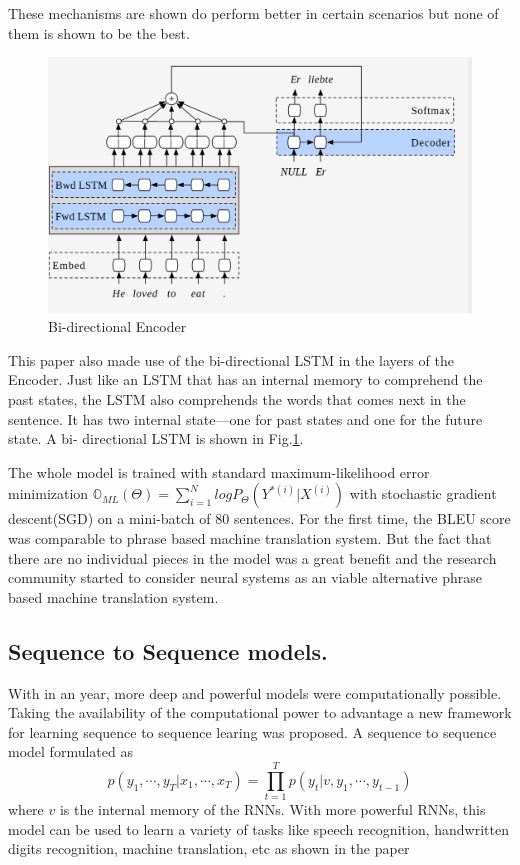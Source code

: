 \documentclass[a4paper]{article}
\begin{document}
These mechanisms  are shown  do perform better  in certain scenarios but none of
them is shown to be the best.


\begin{figure}
  \includegraphics[width=0.9\linewidth]{img/birnn.png}
  \caption{Bi-directional Encoder}
  \label{fig:birnn}
\end{figure}


This paper  also made  use of  the  bi-directional  LSTM  in  the layers  of the
Encoder. Just like  an  LSTM that has an internal memory to comprehend  the past
states, the LSTM also comprehends the words that comes next in the sentence.  It
has two internal state---one for past states and one for the future state. A bi-
directional LSTM is shown in Fig.\ref{fig:birnn}.

The whole model is trained with standard maximum-likelihood  error  minimization
$\mathbb{O}_{ML}(\Theta) = \sum_{i=1}^N log P_\Theta(Y^{*(i)} |  X^{(i)}) $ with
stochastic gradient  descent(SGD) on a mini-batch of 80 sentences. For the first
time, the BLEU score was comparable to phrase based machine  translation system.
But  the fact  that there  are  no  individual pieces  in the  model was a great
benefit and the  research  community started to  consider  neural systems as  an
viable alternative phrase based machine translation system.


\subsection{Sequence  to Sequence models.}
\label{sec:seq}  With  in  an  year,  more   deep   and   powerful  models  were
computationally possible. Taking the availability of the computational power  to
advantage  a  new  framework  for  learning  sequence  to sequence  learing was
proposed. A sequence to sequence model formulated as $$ p(y_1, \cdots, y_T| x_1,
\cdots, x_T) =  \prod_{t=1}^{T} p(y_t| v, y_1,  \cdots,  y_{t-1})$$ where $v$ is
the internal memory of the RNNs. With more powerful RNNs, this model can be used
to  learn a  variety  of  tasks  like  speech  recognition,  handwritten  digits
recognition,   machine   translation,    etc    as   shown    in    the    paper
\cite{sutskever2014sequence}
\end{document}
